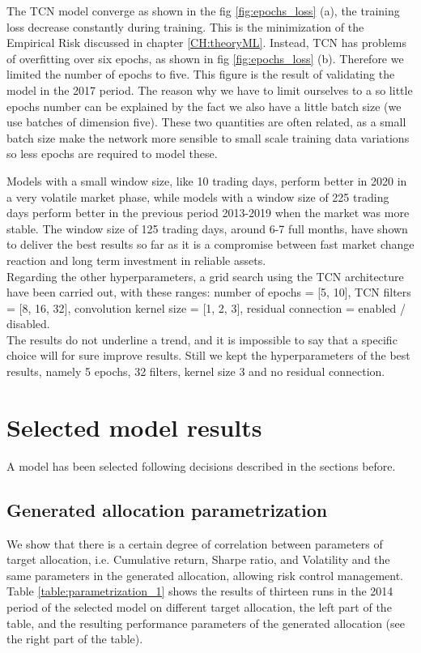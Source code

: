 The TCN model converge as shown in the fig \ref{fig:epochs_loss} (a), the training loss decrease constantly during training. This is the minimization of the Empirical Risk discussed in chapter \ref{CH:theoryML}. Instead, TCN has problems of overfitting over six epochs, as shown in fig \ref{fig:epochs_loss} (b). Therefore we limited the number of epochs to five. This figure is the result of validating the model in the 2017 period. The reason why we have to limit ourselves to a so little epochs number can be explained by the fact we also have a little batch size (we use batches of dimension five). These two quantities are often related, as a small batch size make the network more sensible to small scale training data variations so less epochs are required to model these.



Models with a small window size, like 10 trading days, perform better in 2020 in a very volatile market phase, while models with a window size of 225 trading days perform better in the previous period 2013-2019 when the market was more stable. The window size of 125 trading days, around 6-7 full months, have shown to deliver the best results so far as it is a compromise between fast market change reaction and long term investment in reliable assets. \\

Regarding the other hyperparameters, a grid search using the TCN architecture have been carried out, with these ranges:
number of epochs = [5, 10], TCN filters = [8, 16, 32], convolution kernel size = [1, 2, 3], residual connection = enabled / disabled. \\
The results do not underline a trend, and it is impossible to say that a specific choice will for sure improve results. Still we kept the hyperparameters of the best results, namely 5 epochs, 32 filters, kernel size 3 and no residual connection.

\section{Selected model results}


A model has been selected following decisions described in the sections before.

\subsection{Generated allocation parametrization}
\label{allocation-parametrization}
We show that there is a certain degree of correlation between parameters of target allocation, i.e. Cumulative return, Sharpe ratio, and Volatility and the same parameters in the generated allocation, allowing risk control management. Table \ref{table:parametrization_1} shows the results of thirteen runs in the 2014 period of the selected model on different target allocation, the left part of the table, and the resulting performance parameters of the generated allocation (see the right part of the table). 

